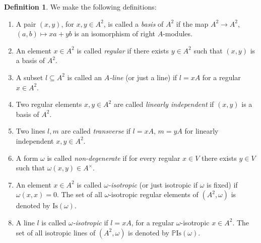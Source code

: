 \documentclass[oneside,11pt]{amsart}
\theoremstyle{definition}
\newtheorem{defn}[thm]{Definition}
\theoremstyle{remark}
\numberwithin{thm}{section}
\numberwithin{equation}{section}
\begin{document}
\begin{defn}
We make the following definitions:
    \begin{enumerate}
        \item A pair $(x,y)$, for $x,y\in A^2$, is called a \emph{basis} of $A^2$ if the map $A^2\to A^2$, $(a,b)\mapsto xa+yb$ is an isomorphism of right $A$-modules.
        
        \item An element $x\in A^2$ is called \emph{regular} if there exists $y\in A^2$ such that $(x,y)$ is a basis of $A^2$.

        \item A subset $l\subseteq A^2$ is called an \emph{$A$-line} (or just a line) if $l=xA$ for a regular $x\in A^2$.

        \item Two regular elements $x,y\in A^2$ are called \emph{linearly independent} if $(x,y)$ is a basis of $A^2$.
        
        \item Two lines $l,m$ are called \emph{transverse} if $l=xA$, $m=yA$ for linearly independent $x,y\in A^2$.

        \item A form $\omega$ is called \emph{non-degenerate} if for every regular $x\in V$ there exists $y\in V$ such that $\omega(x,y)\in A^\times$.
        
        \item An element $x\in A^2$ is called \emph{$\omega$-isotropic} (or just isotropic if $\omega$ is fixed) if $\omega(x,x)=0$. The set of all $\omega$-isotropic regular elements of $(A^2,\omega)$ is denoted by $\mathrm{Is}(\omega)$.
        
        \item A line $l$ is called \emph{$\omega$-isotropic} if $l=xA$, for a regular $\omega$-isotropic $x\in A^2$. The set of all isotropic lines of $(A^2,\omega)$ is denoted by $\mathbb{P}\mathrm{Is}(\omega)$.
    \end{enumerate}
\end{defn}
\end{document}
